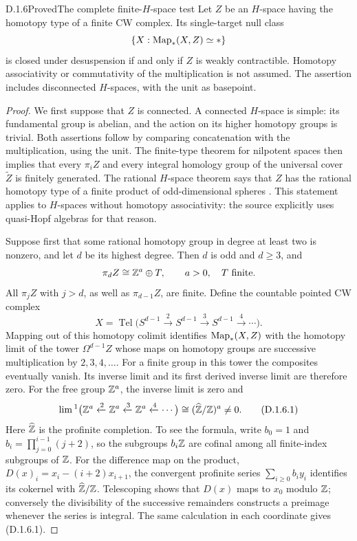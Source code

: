 \begin{claim}{D.1.6}{Proved}{The complete finite-$H$-space test}
Let $Z$ be an $H$-space having the homotopy type of a finite CW
complex. Its single-target null class
\[
 \{X:\operatorname{Map}_*(X,Z)\simeq *\}
\]
is closed under desuspension if and only if $Z$ is weakly
contractible. Homotopy associativity or commutativity of the
multiplication is not assumed. The assertion includes disconnected
$H$-spaces, with the unit as basepoint.
\end{claim}
\begin{proof}
We first suppose that $Z$ is connected. A connected $H$-space is
simple: its fundamental group is abelian, and the action on its
higher homotopy groups is trivial. Both assertions follow by
comparing concatenation with the multiplication, using the unit.
The finite-type theorem for nilpotent spaces
\cite[Theorem~4.5.2]{I_MayPonto2012} then implies that every
$\pi_i Z$ and every integral homology group of the universal cover
$\widetilde Z$ is finitely generated. The rational $H$-space
theorem says that $Z$ has the rational homotopy type of a finite
product of odd-dimensional spheres
\cite[Theorem~9.1.1 and Corollary~9.1.2]{I_MayPonto2012}.
This statement applies to $H$-spaces without homotopy associativity:
the source explicitly uses quasi-Hopf algebras for that reason.

Suppose first that some rational homotopy group in degree at least
two is nonzero, and let $d$ be its highest degree. Then $d$ is odd
and $d\geq3$, and
\[
 \pi_d Z\cong\mathbb Z^a\oplus T,\qquad a>0,\quad T\text{ finite}.
\]
All $\pi_jZ$ with $j>d$, as well as $\pi_{d-1}Z$, are finite.
Define the countable pointed CW complex
\[
 X=\operatorname{Tel}\bigl(
 S^{d-1}\xrightarrow{2}S^{d-1}
 \xrightarrow{3}S^{d-1}
 \xrightarrow{4}\cdots\bigr).
\]
Mapping out of this homotopy colimit identifies $\operatorname{Map}_*(X,Z)$
with the homotopy limit of the tower $\Omega^{d-1}Z$ whose maps
on homotopy groups are successive multiplication by $2,3,4,\ldots$.
For a finite group in this tower the composites eventually vanish.
Its inverse limit and its first derived inverse limit are therefore
zero. For the free group $\mathbb Z^a$, the inverse limit is zero and
\[
 \lim{}^1\bigl(\mathbb Z^a\xleftarrow{2}\mathbb Z^a
                 \xleftarrow{3}\mathbb Z^a
                 \xleftarrow{4}\cdots\bigr)
       \cong(\widehat{\mathbb Z}/\mathbb Z)^a\ne0.                 \tag{D.1.6.1}
\]
Here $\widehat{\mathbb Z}$ is the profinite completion. To see the
formula, write $b_0=1$ and
$b_i=\prod_{j=0}^{i-1}(j+2)$, so the subgroups $b_i\mathbb Z$ are
cofinal among all finite-index subgroups of $\mathbb Z$.
For the difference map on the product,
$D(x)_i=x_i-(i+2)x_{i+1}$, the convergent profinite series
$\sum_{i\geq0}b_i y_i$ identifies its cokernel with
$\widehat{\mathbb Z}/\mathbb Z$. Telescoping shows that $D(x)$ maps to $x_0$
modulo $\mathbb Z$; conversely the divisibility of the successive
remainders constructs a preimage whenever the series is integral.
The same calculation in each coordinate gives (D.1.6.1).


\end{proof}
